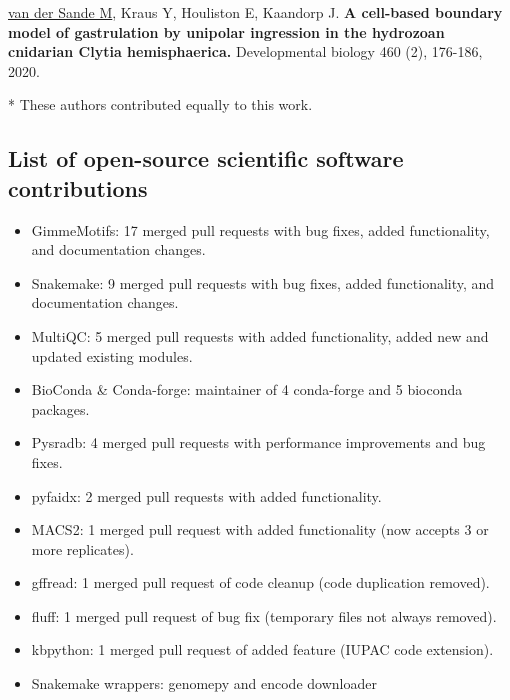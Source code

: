 \noindent
\underline{van der Sande M}, Kraus Y, Houliston E, Kaandorp J. \textbf{A cell-based boundary model of gastrulation by unipolar ingression in the hydrozoan cnidarian Clytia hemisphaerica.}  Developmental biology 460 (2), 176-186, 2020. \cite{vanderSande2020}
\newline

\noindent
* These authors contributed equally to this work.

\newpage
\subsection{List of open-source scientific software contributions}

\begin{itemize}
    \item GimmeMotifs: 17 merged pull requests with bug fixes, added functionality, and documentation changes.
    \item Snakemake: 9 merged pull requests with bug fixes, added functionality, and documentation changes.
    \item MultiQC: 5 merged pull requests with added functionality, added new and updated existing modules.
    \item BioConda \& Conda-forge:  maintainer of 4 conda-forge and 5 bioconda packages.
    \item Pysradb: 4 merged pull requests with performance improvements and bug fixes.
    \item pyfaidx: 2 merged pull requests with added functionality.
    \item MACS2: 1 merged pull request with added functionality (now accepts 3 or more replicates).
    \item gffread: 1 merged pull request of code cleanup (code duplication removed).
    \item fluff: 1 merged pull request of bug fix (temporary files not always removed).
    \item kbpython: 1 merged pull request of added feature (IUPAC code extension).
    \item Snakemake wrappers: genomepy and encode downloader
    \end{itemize}

\newpage